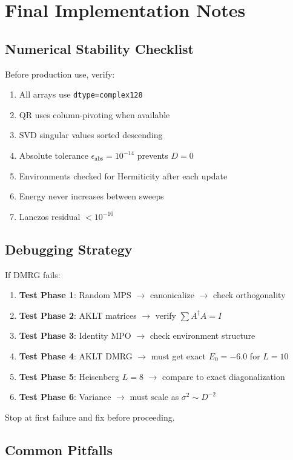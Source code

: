 \documentclass[aps,prb,onecolumn,scriptaddress]{revtex4-2}
\newcommand{\eps}{\epsilon}
\begin{document}
	\section{Final Implementation Notes}
	
	\subsection{Numerical Stability Checklist}
	
	Before production use, verify:
	\begin{enumerate}
		\item All arrays use \texttt{dtype=complex128}
		\item QR uses column-pivoting when available
		\item SVD singular values sorted descending
		\item Absolute tolerance $\eps_{\text{abs}} = 10^{-14}$ prevents $D=0$
		\item Environments checked for Hermiticity after each update
		\item Energy never increases between sweeps
		\item Lanczos residual $< 10^{-10}$
	\end{enumerate}
	
	\subsection{Debugging Strategy}
	
	If DMRG fails:
	\begin{enumerate}
		\item \textbf{Test Phase 1}: Random MPS $\to$ canonicalize $\to$ check orthogonality
		\item \textbf{Test Phase 2}: AKLT matrices $\to$ verify $\sum A^\dagger A = I$
		\item \textbf{Test Phase 3}: Identity MPO $\to$ check environment structure
		\item \textbf{Test Phase 4}: AKLT DMRG $\to$ must get exact $E_0 = -6.0$ for $L=10$
		\item \textbf{Test Phase 5}: Heisenberg $L=8$ $\to$ compare to exact diagonalization
		\item \textbf{Test Phase 6}: Variance $\to$ must scale as $\sigma^2 \sim D^{-2}$
	\end{enumerate}
	
	Stop at first failure and fix before proceeding.
	
	\subsection{Common Pitfalls}
	
\end{document}
